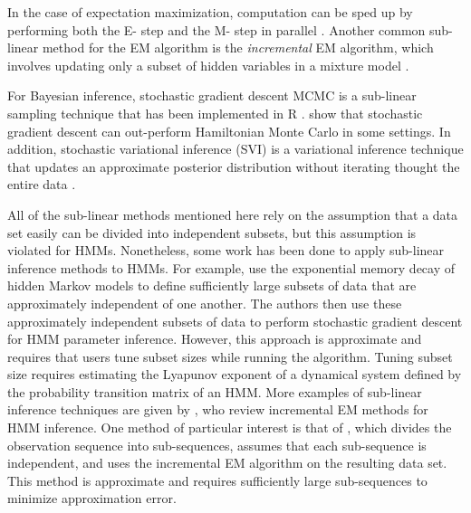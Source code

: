 In the case of expectation maximization, computation can be sped up by performing both the E- step and the M- step in parallel \citep{Lee:2021}. Another common sub-linear method for the EM algorithm is the \textit{incremental} EM algorithm, which involves updating only a subset of hidden variables in a mixture model \citep{Neal:1998, Thiesson:2001, Karimi:2019}. %

For Bayesian inference, stochastic gradient descent MCMC is a sub-linear sampling technique \citep{Ma:2015} that has been implemented in R \citep{Baker:2019}. \citet{Nemeth:2021} show that stochastic gradient descent can out-perform Hamiltonian Monte Carlo in some settings. In addition, stochastic variational inference (SVI) is a variational inference technique that updates an approximate posterior distribution without iterating thought the entire data  \citep{Hoffman:2013}.

All of the sub-linear methods mentioned here rely on the assumption that a data set easily can be divided into independent subsets, but this assumption is violated for HMMs. Nonetheless, some work has been done to apply sub-linear inference methods to HMMs.
For example, \citet{Ye:2017} use the exponential memory decay of hidden Markov models to define sufficiently large subsets of data that are approximately independent of one another. The authors then use these approximately independent subsets of data to perform stochastic gradient descent for HMM parameter inference. However, this approach is approximate and requires that users tune subset sizes while running the algorithm. Tuning subset size requires estimating the Lyapunov exponent of a dynamical system defined by the probability transition matrix of an HMM.
More examples of sub-linear inference techniques are given by \citet{Khreich:2012}, who review incremental EM methods for HMM inference. One method of particular interest is that of \citet{Gotoh:1998}, which divides the observation sequence into sub-sequences, assumes that each sub-sequence is independent, and uses the incremental EM algorithm on the resulting data set. This method is approximate and requires sufficiently large sub-sequences to minimize approximation error. 

